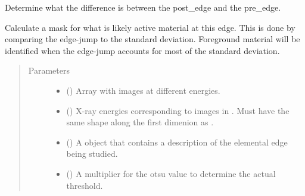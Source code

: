\documentclass[letterpaper,10pt,english]{sphinxmanual}
\begin{document}

\begin{fulllineitems}
\label{\detokenize{xanespy:xanespy.xanes_math.k_edge_jump}}
Determine what the difference is between the post\_edge and the
pre\_edge.

\end{fulllineitems}


\begin{fulllineitems}
\label{\detokenize{xanespy:xanespy.xanes_math.k_edge_mask}}
Calculate a mask for what is likely active material at this
edge. This is done by comparing the edge-jump to the standard
deviation. Foreground material will be identified when the
edge-jump accounts for most of the standard deviation.
\begin{quote}\begin{description}
\item[{Parameters}] \leavevmode\begin{itemize}
\item {} 
 () \textendash{} Array with images at different energies.

\item {} 
 () \textendash{} X-ray energies corresponding to images in . Must have
the same shape along the first dimenion as .

\item {} 
 ({\hyperref[\detokenize{xanespy:xanespy.edges.KEdge}]{}}) \textendash{} A {\hyperref[\detokenize{xanespy:xanespy.edges.KEdge}]{}} object that contains a
description of the elemental edge being studied.

\item {} 
 (\sphinxstyleliteralemphasis{, }) \textendash{} A multiplier for the otsu value to determine the actual
threshold.


\end{itemize}
\end{description}
\end{quote}
\end{fulllineitems}
\end{document}
